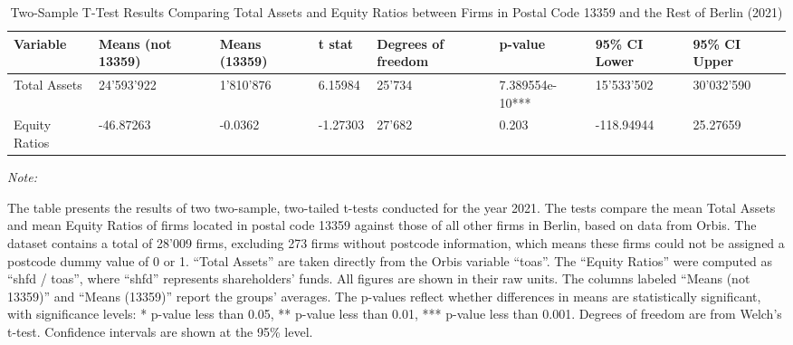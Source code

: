\documentclass{article}
\begin{document}
\begin{landscape}
\begin{table}[!h]
\centering
\caption{\label{tbl:ttest_summary} Two-Sample T-Test Results Comparing Total Assets and Equity Ratios between Firms in Postal Code 13359 and the Rest of Berlin (2021)}
\centering
\begin{threeparttable}
\begin{tabular}[t]{llllllll}
\toprule
Variable & Means (not 13359) & Means (13359) & t stat & Degrees of freedom & p-value & 95\% CI Lower & 95\% CI Upper\\
\midrule
Total Assets & 24'593'922 & 1'810'876 & 6.15984 & 25'734 & 7.389554e-10*** & 15'533'502 & 30'032'590\\
Equity Ratios & -46.87263 & -0.0362 & -1.27303 & 27'682 & 0.203 & -118.94944 & 25.27659\\
\bottomrule
\end{tabular}
\begin{tablenotes}[para]
\item \textit{Note: } 
\item The table presents the results of two two-sample, two-tailed t-tests conducted for the year 2021. The tests compare the mean Total Assets and mean Equity Ratios of firms located in postal code 13359 against those of all other firms in Berlin, based on data from Orbis. The dataset contains a total of 28'009 firms, excluding 273 firms without postcode information, which means these firms could not be assigned a postcode dummy value of 0 or 1. “Total Assets” are taken directly from the Orbis variable “toas”. The “Equity Ratios” were computed as “shfd / toas”, where “shfd” represents shareholders' funds. All figures are shown in their raw units. The columns labeled “Means (not 13359)” and “Means (13359)” report the groups' averages. The p-values reflect whether differences in means are statistically significant, with significance levels: * p-value less than 0.05, ** p-value less than 0.01, *** p-value less than 0.001. Degrees of freedom are from Welch’s t-test. Confidence intervals are shown at the 95\% level.
\end{tablenotes}
\end{threeparttable}
\end{table}
\end{landscape}
\end{document}
